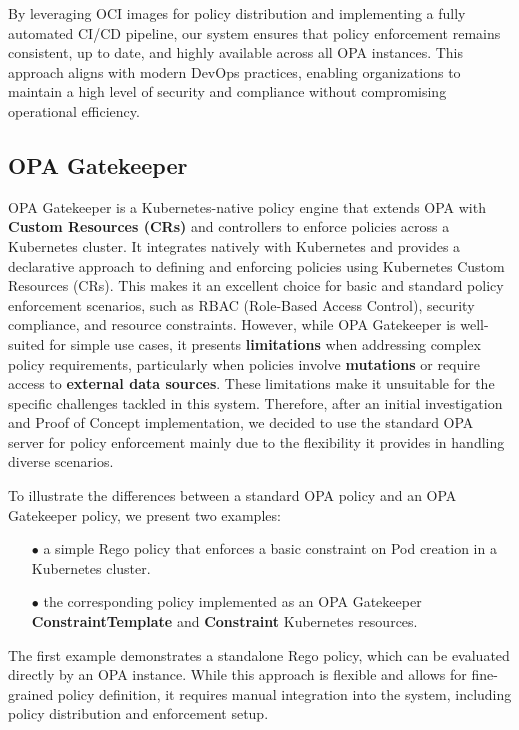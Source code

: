 By leveraging OCI images for policy distribution and implementing a fully automated CI/CD pipeline, our system ensures that policy enforcement remains consistent, up to date, and highly available across all OPA instances. This approach aligns with modern DevOps practices, enabling organizations to maintain a high level of security and compliance without compromising operational efficiency.

\newpage

\subsection{OPA Gatekeeper}

OPA Gatekeeper is a Kubernetes-native policy engine that extends OPA with \textbf{Custom Resources (CRs)} and controllers to enforce policies across a Kubernetes cluster. It integrates natively with Kubernetes and provides a declarative approach to defining and enforcing policies using Kubernetes Custom Resources (CRs). This makes it an excellent choice for basic and standard policy enforcement scenarios, such as RBAC (Role-Based Access Control), security compliance, and resource constraints.
However, while OPA Gatekeeper is well-suited for simple use cases, it presents \textbf{limitations} when addressing complex policy requirements, particularly when policies involve \textbf{mutations} or require access to \textbf{external data sources}. These limitations make it unsuitable for the specific challenges tackled in this system. Therefore, after an initial investigation and Proof of Concept implementation, we decided to use the standard OPA server for policy enforcement mainly due to the flexibility it provides in handling diverse scenarios.

To illustrate the differences between a standard OPA policy and an OPA Gatekeeper policy, we present two examples:  
\begin{itemize}[itemsep=0.2pt, topsep=1pt]
  \item[$\bullet$] a simple Rego policy that enforces a basic constraint on Pod creation in a Kubernetes cluster.
  \item[$\bullet$] the corresponding policy implemented as an OPA Gatekeeper \textbf{ConstraintTemplate} and \textbf{Constraint} Kubernetes resources.
\end{itemize}

The first example demonstrates a standalone Rego policy, which can be evaluated directly by an OPA instance. While this approach is flexible and allows for fine-grained policy definition, it requires manual integration into the system, including policy distribution and enforcement setup.  

